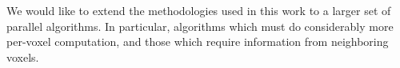 We would like to extend the methodologies used in this work to a larger
set of parallel algorithms.  In particular, algorithms which must
do considerably more per-voxel computation, and those which require
information from neighboring voxels.

%
%
%
%
%
%
%
%
%
%
